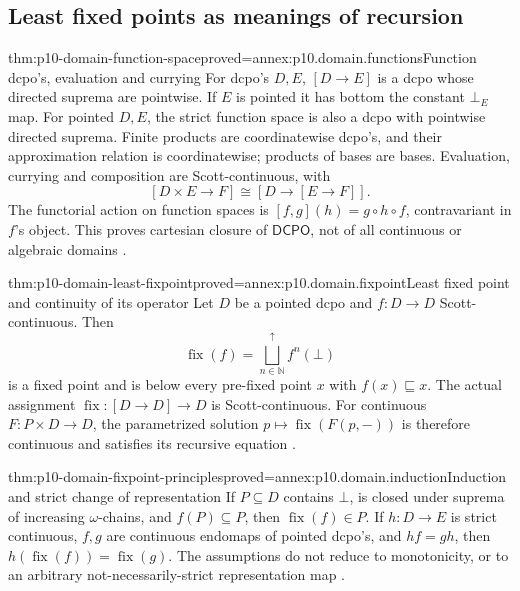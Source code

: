 \subsection{Least fixed points as meanings of recursion}

\begin{hbtheorem}{thm:p10-domain-function-space}{proved=annex:p10.domain.functions}{Function dcpo's, evaluation and currying}
For dcpo's \(D,E\), \([D\longrightarrow E]\) is a dcpo whose
directed suprema are pointwise. If \(E\) is pointed it has bottom
the constant \(\bot_E\) map. For pointed \(D,E\), the strict function space is also a
dcpo with pointwise directed suprema.
Finite products are coordinatewise dcpo's, and their approximation
relation is coordinatewise; products of bases are bases.
Evaluation, currying and composition are Scott-continuous, with
\[
 [D\times E\longrightarrow F]\cong[D\longrightarrow[E\longrightarrow F]].
\]
The functorial action on function spaces is
\([f,g](h)=g\circ h\circ f\), contravariant in \(f\)'s object.
This proves cartesian closure of \(\mathsf{DCPO}\), not of all
continuous or algebraic domains
\cite[Proposition~2.1.18; Section~3.2.1--2, pp.~16,42--44]
{AbramskyJungCorrectedExpandedDomainTheory}.
\end{hbtheorem}

\begin{hbtheorem}{thm:p10-domain-least-fixpoint}{proved=annex:p10.domain.fixpoint}{Least fixed point and continuity of its operator}
Let \(D\) be a pointed dcpo and \(f:D\to D\) Scott-continuous.
Then
\[
 \operatorname{fix}(f)=\bigsqcup^{\uparrow}_{n\in\mathbb N}f^n(\bot)
\]
is a fixed point and is below every pre-fixed point
\(x\) with \(f(x)\sqsubseteq x\). The actual assignment
\(\operatorname{fix}:[D\longrightarrow D]\to D\) is Scott-continuous.
For continuous \(F:P\times D\to D\), the parametrized solution
\(p\mapsto\operatorname{fix}(F(p,-))\) is therefore continuous and
satisfies its recursive equation
\cite[Theorem~2.1.19; Exercise~2.3.9(17), pp.~16,32]
{AbramskyJungCorrectedExpandedDomainTheory}.
\end{hbtheorem}

\begin{hbtheorem}{thm:p10-domain-fixpoint-principles}{proved=annex:p10.domain.induction}{Induction and strict change of representation}
If \(P\subseteq D\) contains \(\bot\), is closed under suprema
of increasing \(\omega\)-chains, and \(f(P)\subseteq P\), then
\(\operatorname{fix}(f)\in P\). If \(h:D\to E\) is strict
continuous, \(f,g\) are continuous endomaps of pointed dcpo's, and
\(hf=gh\), then \(h(\operatorname{fix}(f))=\operatorname{fix}(g)\).
The assumptions do not reduce to monotonicity, or to an arbitrary
not-necessarily-strict representation map
\cite[Lemmas~2.1.20--21, p.~17]{AbramskyJungCorrectedExpandedDomainTheory}.
\end{hbtheorem}


